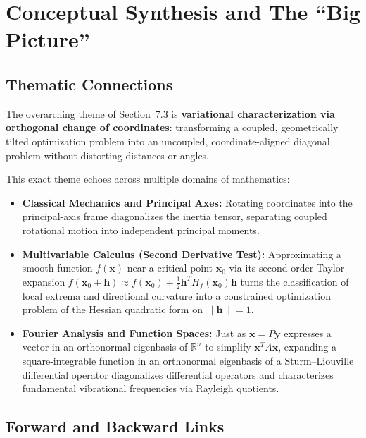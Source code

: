 \documentclass[11pt, letterpaper]{article}
\theoremstyle{definition}
\theoremstyle{remark}
\newcommand{\R}{\mathbb{R}}
\begin{document}
\section{Conceptual Synthesis and The ``Big Picture''}

\subsection{Thematic Connections}
The overarching theme of Section~7.3 is \textbf{variational characterization via orthogonal change of coordinates}: transforming a coupled, geometrically tilted optimization problem into an uncoupled, coordinate-aligned diagonal problem without distorting distances or angles.

This exact theme echoes across multiple domains of mathematics:
\begin{itemize}
    \item \textbf{Classical Mechanics and Principal Axes:} Rotating coordinates into the principal-axis frame diagonalizes the inertia tensor, separating coupled rotational motion into independent principal moments.
    \item \textbf{Multivariable Calculus (Second Derivative Test):} Approximating a smooth function $f(\mathbf{x})$ near a critical point $\mathbf{x}_0$ via its second-order Taylor expansion $f(\mathbf{x}_0 + \mathbf{h}) \approx f(\mathbf{x}_0) + \frac{1}{2}\mathbf{h}^T H_f(\mathbf{x}_0)\mathbf{h}$ turns the classification of local extrema and directional curvature into a constrained optimization problem of the Hessian quadratic form on $\|\mathbf{h}\| = 1$.
    \item \textbf{Fourier Analysis and Function Spaces:} Just as $\mathbf{x} = P\mathbf{y}$ expresses a vector in an orthonormal eigenbasis of $\R^n$ to simplify $\mathbf{x}^T A \mathbf{x}$, expanding a square-integrable function in an orthonormal eigenbasis of a Sturm–Liouville differential operator diagonalizes differential operators and characterizes fundamental vibrational frequencies via Rayleigh quotients.
\end{itemize}

\subsection{Forward and Backward Links}
\end{document}
